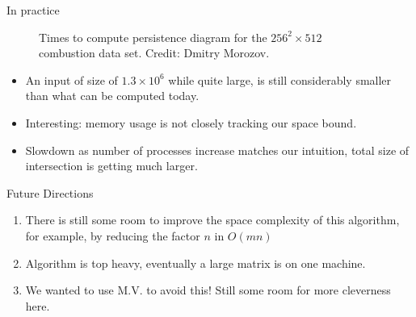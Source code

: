 \begin{frame}[fragile]{In practice}
\pltCombustionMed
\begin{figure}
    \centering
    \caption{Times to compute persistence diagram for the $256^2 \times 512$
             combustion data set. Credit: Dmitry Morozov.}
    \label{fig:times}
\end{figure}
\pause
\vspace{-.75cm}
\begin{itemize}
\item An input of size of $1.3 \times 10^6$ while quite large, is still considerably smaller than what can be computed today.
\item Interesting: memory usage is not closely tracking our space bound.
\item Slowdown as number of processes increase matches our intuition, total size of intersection is getting much larger.
\end{itemize}
\end{frame}

\begin{frame}{Future Directions}
\begin{enumerate}
\item There is still some room to improve the space complexity of this algorithm, for example, by reducing the factor $n$ in $O(mn)$
\item Algorithm is top heavy, eventually a large matrix is on one machine. 
\item We wanted to use M.V. to avoid this! Still some room for more cleverness here.
\end{enumerate}
\end{frame}

